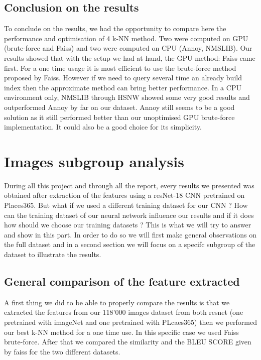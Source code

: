 \documentclass[a4paper]{article}
\begin{document}
\subsection{Conclusion on the results}
	To conclude on the results, we had the opportunity to compare here the performance and optimisation of 4 k-NN method. Two were computed on GPU (brute-force and Faiss) and two were computed on CPU (Annoy, NMSLIB). Our results showed that with the setup we had at hand, the GPU method: Faiss came first. For a one time usage it is most efficient to use the brute-force method proposed by Faiss. However if we need to query several time an already build index then the approximate method can bring better performance. In a CPU environment only, NMSLIB through HSNW showed some very good results and outperformed Annoy by far on our dataset. Annoy still seems to be a good solution as it still performed better than our unoptimised GPU brute-force implementation. It could also be a good choice for its simplicity.

\section{Images subgroup analysis}
	
	During all this project and through all the report, every results we presented was obtained after extraction of the features using a resNet-18 CNN pretrained on Places365. But what if we used a different training dataset for our CNN ? How can the training dataset of our neural network influence our results and if it does how should we choose our training datasets ? This is what we will try to answer and show in this part. In order to do so we will first make general observations on the full dataset and in a second section we will focus on a specifc subgroup of the dataset to illustrate the results.
	 
	\subsection{General comparison of the feature extracted}
	
	A first thing we did to be able to properly compare the results is that we extracted the features from our 118'000 images dataset from both resnet (one pretrained with imageNet and one pretrained with PLcaes365) then we performed our best k-NN method for a one time use. In this specific case we used Faiss brute-force. After that we compared the similarity and the BLEU SCORE given by faiss for the two different datasets.
	
\end{document}
